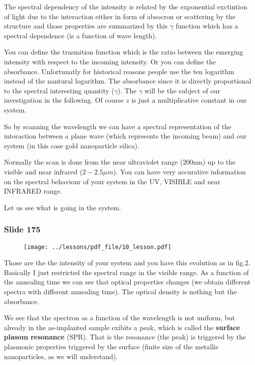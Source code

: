 \documentclass[../main/main.tex]{subfiles}
\begin{document}
The spectral dependency of the intensity is related by the exponential exctintion of light due to the interaction either in form of absocron or scattering by the structure and those properties are summarized by this \( \gamma   \) function which has a spectral dependence (is a function of wave length).

You can define the trasmition function which is the ratio between the emerging intensity with respect to the incoming intensity. Or you can define the absorbance.
Unfortunatly for historical reasone people use the ten logarithm instead of the nantural logarithm. The absorbance since it is directly proportional to the spectral interesting quantity (\( \gamma   \)).
The \( \gamma   \) will be
the subject of our investigation in the following. Of course \( z \) is just a multiplicative constant in our system.

So by scanning the wavelength we can have a spectral representation of the interaction between a plane wave (which represents the incoming beam) and our system (in this case gold nanoparticle silica).

Normally the scan is done from the near ultraviolet range (200nm) up to the visible and near infrared (\( 2-2.5 \mu m \)). You can have very accurative information on the spectral behaviour of your system in the UV, VISIBLE and near INFRARED range.

Let us see what is going in the system.

\newpage

\subsubsection{Slide 175}

\begin{figure}[h!]
\centering
\texttt{[image: ../lessons/pdf\_file/10\_lesson.pdf]}
\end{figure}

Those are the the intensity of your system and you have this evolution as in fig.2.
Basically I just restricted the spectral range in the visible range.
As a function of the annealing time we can see that optical properties changes (we obtain different spectra with different annealing time). The optical density is nothing but the absorbance.

We see that the spectron as a function of the wavelength is not uniform, but already in the as-implanted sample exibits a peak, which is called the \textbf{surface plasom resonance} (SPR). That is the resonance (the peak) is triggered by the plasmonic properties triggered by the surface (finite size of the metallic nanoparticles, as we will understand).
\end{document}
